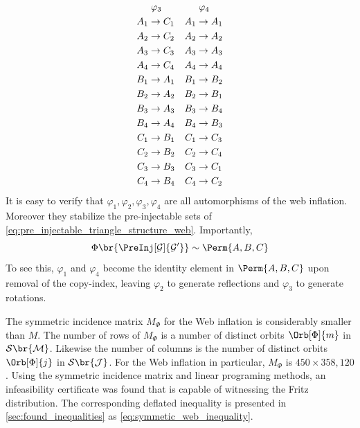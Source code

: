 \documentclass[aps, 10pt, english, twoside, pra, nofootinbib, tightenlines, longbibliography, superscriptaddress]{revtex4-1}
\renewcommand{\Events}[1]{\mathcal{S}\br{#1}} %
\begin{document}
\begin{equation*}
\begin{aligned}[c]
    &\hspace{1mm}\varphi_3 \\
    A_1 &\to C_1 \\A_2 &\to C_2 \\A_3 &\to C_3 \\A_4 &\to C_4 \\B_1 &\to A_1 \\B_2 &\to A_2 \\B_3 &\to A_3 \\B_4 &\to A_4 \\C_1 &\to B_1 \\C_2 &\to B_2 \\C_3 &\to B_3 \\C_4 &\to B_4
    \end{aligned}
    \quad
    \begin{aligned}[c]
    &\hspace{1mm}\varphi_4 \\
    A_1 &\to A_1 \\A_2 &\to A_2 \\A_3 &\to A_3 \\A_4 &\to A_4 \\B_1 &\to B_2 \\B_2 &\to B_1 \\B_3 &\to B_4 \\B_4 &\to B_3 \\C_1 &\to C_3 \\C_2 &\to C_4 \\C_3 &\to C_1 \\C_4 &\to C_2
    \end{aligned}
    \end{equation*}
    It is easy to verify that $\varphi_1, \varphi_2, \varphi_3, \varphi_4$ are all automorphisms of the web inflation. Moreover they stabilize the pre-injectable sets of \cref{eq:pre_injectable_triangle_structure_web}. Importantly,
    \[ \gp\br{\PreInj[\graph]{\graph'}} \sim \Perm{A,B,C} \]
    To see this, $\varphi_1$ and $\varphi_4$ become the identity element in $\Perm{A,B,C}$ upon removal of the copy-index, leaving $\varphi_2$ to generate reflections and $\varphi_3$ to generate rotations.

    The symmetric incidence matrix $M_{\Phi}$ for the Web inflation is considerably smaller than $M$. The number of rows of $M_{\Phi}$ is a number of distinct orbits $\Orb[\Phi]{m}$ in $\Events{\mscenario}$. Likewise the number of columns is the number of distinct orbits $\Orb[\Phi]{j}$ in $\Events{\jointvar}$. For the Web inflation in particular, $M_{\Phi}$ is $450 \times 358,120$. Using the symmetric incidence matrix and linear programing methods, an infeasibility certificate was found that is capable of witnessing the Fritz distribution. The corresponding deflated inequality is presented in \cref{sec:found_inequalities} as \cref{eq:symmetic_web_inequality}.
\end{document}
